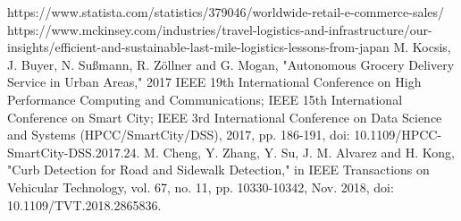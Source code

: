 \documentclass{article}
\begin{document}
\begin{multicols}{2}

\begin{thebibliography}{10}
 https://www.statista.com/statistics/379046/worldwide-retail-e-commerce-sales/
https://www.mckinsey.com/industries/travel-logistics-and-infrastructure/our-insights/efficient-and-sustainable-last-mile-logistics-lessons-from-japan
M. Kocsis, J. Buyer, N. Sußmann, R. Zöllner and G. Mogan, "Autonomous Grocery Delivery Service in Urban Areas," 2017 IEEE 19th International Conference on High Performance Computing and Communications; IEEE 15th International Conference on Smart City; IEEE 3rd International Conference on Data Science and Systems (HPCC/SmartCity/DSS), 2017, pp. 186-191, doi: 10.1109/HPCC-SmartCity-DSS.2017.24.
M. Cheng, Y. Zhang, Y. Su, J. M. Alvarez and H. Kong, "Curb Detection for Road and Sidewalk Detection," in IEEE Transactions on Vehicular Technology, vol. 67, no. 11, pp. 10330-10342, Nov. 2018, doi: 10.1109/TVT.2018.2865836.



\end{thebibliography}

\end{multicols}
\end{document}
